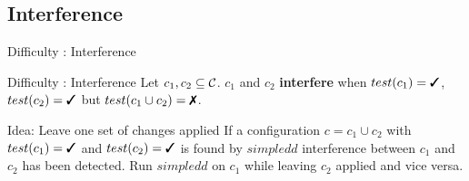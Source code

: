 \subsection{Interference}
\begin{frame}{Difficulty : Interference}

	\begin{alertblock}{Difficulty : Interference}
		Let $c_1,c_2 \subseteq \mathcal{C}$. $c_1$ and $c_2$ \textbf{interfere} when $test(c_1)=\cmark$, $test(c_2)=\cmark$ but $test(c_1\cup c_2) = \xmark$.
	\end{alertblock}

	\bigskip
	\pause

	\begin{exampleblock}{Idea: Leave one set of changes applied}
		If a configuration $c = c_1 \cup c_2$ with $test(c_1)=\cmark$ and $test(c_2)=\cmark$ is found by $simpledd$ interference between $c_1$ and $c_2$ has been detected. Run $simpledd$ on $c_1$ while leaving $c_2$ applied and vice versa.
	\end{exampleblock}

\end{frame}
	
